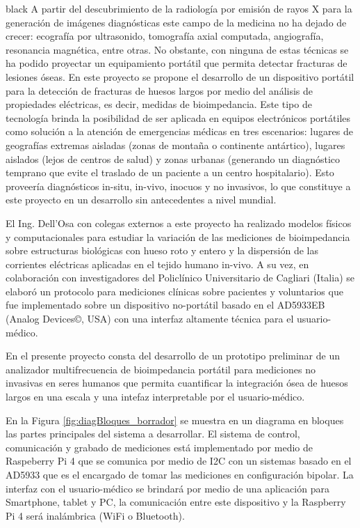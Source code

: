 \documentclass[11pt]{charter}
\begin{document}
\begin{consigna}{black}
A partir del descubrimiento de la radiología por emisión de rayos X para la generación de imágenes diagnósticas este campo de la medicina no ha dejado de crecer: ecografía por ultrasonido, tomografía axial computada, angiografía, resonancia magnética, entre otras. No obstante, con ninguna de estas técnicas se ha podido proyectar un equipamiento portátil que permita detectar fracturas de lesiones óseas. 
En este proyecto se propone el desarrollo de un dispositivo portátil para la detección de fracturas de huesos largos por medio del análisis de propiedades eléctricas, es decir, medidas de bioimpedancia. Este tipo de tecnología brinda la posibilidad de ser aplicada en equipos electrónicos portátiles como solución a la atención de emergencias médicas en tres escenarios: lugares de geografías extremas aisladas (zonas de montaña o continente antártico), lugares aislados (lejos de centros de salud) y zonas urbanas (generando un diagnóstico temprano que evite el traslado de un paciente a un centro hospitalario). Esto proveería diagnósticos in-situ, in-vivo, inocuos y no invasivos, lo que constituye a este proyecto en un desarrollo sin antecedentes a nivel mundial.

El Ing. Dell'Osa con colegas externos a este proyecto ha realizado modelos físicos y computacionales para estudiar la variación de las mediciones de bioimpedancia sobre estructuras biológicas con hueso roto y entero y la dispersión de las corrientes eléctricas aplicadas en el tejido humano in-vivo. A su vez, en colaboración con investigadores del Policlínico Universitario de Cagliari (Italia) se elaboró un protocolo para mediciones clínicas sobre pacientes y voluntarios que fue implementado sobre un dispositivo no-portátil basado en el AD5933EB (Analog Devices©, USA) con una interfaz altamente técnica para el usuario-médico.

En el presente proyecto consta del desarrollo de un prototipo preliminar de un analizador multifrecuencia de bioimpedancia portátil para mediciones no invasivas en seres humanos que permita cuantificar la integración ósea de huesos largos en una escala y una intefaz interpretable por el usuario-médico.

En la Figura \ref{fig:diagBloques_borrador} se muestra en un diagrama en bloques las partes principales del sistema a desarrollar. El sistema de control, comunicación y grabado de mediciones está implementado por medio de Raspeberry Pi 4 que se comunica por medio de I2C con un sistemas basado en el AD5933 que es el encargado de tomar las mediciones en configuración bipolar. La interfaz con el usuario-médico se brindará por medio de una aplicación para Smartphone, tablet y PC, la comunicación entre este dispositivo y la Raspberry Pi 4 será inalámbrica (WiFi o Bluetooth).


\end{consigna}
\end{document}
